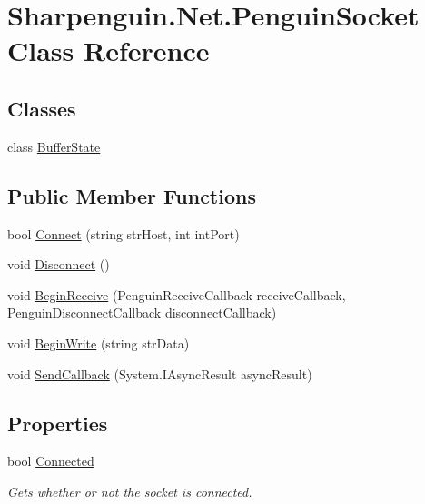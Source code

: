 \hypertarget{classSharpenguin_1_1Net_1_1PenguinSocket}{\section{Sharpenguin.\-Net.\-Penguin\-Socket Class Reference}
\label{classSharpenguin_1_1Net_1_1PenguinSocket}
}
\subsection*{Classes}
\begin{DoxyCompactItemize}
\item 
class \hyperlink{classSharpenguin_1_1Net_1_1PenguinSocket_1_1BufferState}{Buffer\-State}
\end{DoxyCompactItemize}
\subsection*{Public Member Functions}
\begin{DoxyCompactItemize}
\item 
bool \hyperlink{classSharpenguin_1_1Net_1_1PenguinSocket_a024e4bbf684a0e2a279c477174e1c5d2}{Connect} (string str\-Host, int int\-Port)
\item 
void \hyperlink{classSharpenguin_1_1Net_1_1PenguinSocket_ac60926b98466d10e0db01bd48c4b4ad8}{Disconnect} ()
\item 
void \hyperlink{classSharpenguin_1_1Net_1_1PenguinSocket_af55abe0b108fa3b4e94e20a639812b32}{Begin\-Receive} (Penguin\-Receive\-Callback receive\-Callback, Penguin\-Disconnect\-Callback disconnect\-Callback)
\item 
void \hyperlink{classSharpenguin_1_1Net_1_1PenguinSocket_a1a22198956191adbdfcd2649d141f8f6}{Begin\-Write} (string str\-Data)
\item 
void \hyperlink{classSharpenguin_1_1Net_1_1PenguinSocket_a08bb8907688a36801115b1797aca2542}{Send\-Callback} (System.\-I\-Async\-Result async\-Result)
\end{DoxyCompactItemize}
\subsection*{Properties}
\begin{DoxyCompactItemize}
\item 
\hypertarget{classSharpenguin_1_1Net_1_1PenguinSocket_aebcbb81e484814de900b1254e0798717}{bool \hyperlink{classSharpenguin_1_1Net_1_1PenguinSocket_aebcbb81e484814de900b1254e0798717}{Connected}}\label{classSharpenguin_1_1Net_1_1PenguinSocket_aebcbb81e484814de900b1254e0798717}

\begin{DoxyCompactList}\small\item\em Gets whether or not the socket is connected. \end{DoxyCompactList}\end{DoxyCompactItemize}


